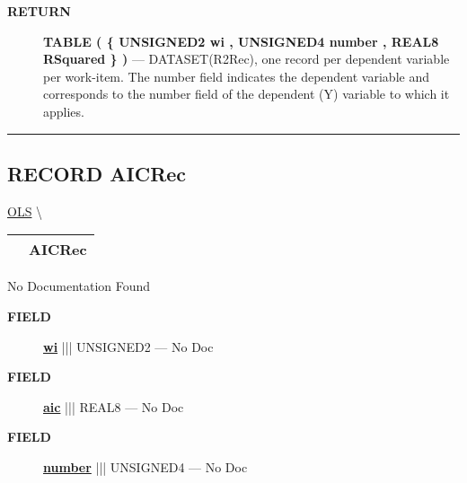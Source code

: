 \par
\begin{description}
\item [\colorbox{tagtype}{\color{white} \textbf{\textsf{RETURN}}}] \textbf{TABLE ( \{ UNSIGNED2 wi , UNSIGNED4 number , REAL8 RSquared \} )} --- DATASET(R2Rec), one record per dependent variable per work-item. The number field indicates the dependent variable and corresponds to the number field of the dependent (Y) variable to which it applies.
\end{description}




\rule{\linewidth}{0.5pt}
\subsection*{\textsf{\colorbox{headtoc}{\color{white} RECORD}
AICRec}}

\hypertarget{ecldoc:linearregression.ols.aicrec}{}
\hspace{0pt} \hyperlink{ecldoc:linearregression.ols}{OLS} \textbackslash 

{\renewcommand{\arraystretch}{1.5}
\begin{tabularx}{\textwidth}{|>{\raggedright\arraybackslash}l|X|}
\hline
\hspace{0pt}\mytexttt{\color{red} } & \textbf{AICRec} \\
\hline
\end{tabularx}
}

\par





No Documentation Found







\par
\begin{description}
\item [\colorbox{tagtype}{\color{white} \textbf{\textsf{FIELD}}}] \textbf{\underline{wi}} ||| UNSIGNED2 --- No Doc
\item [\colorbox{tagtype}{\color{white} \textbf{\textsf{FIELD}}}] \textbf{\underline{aic}} ||| REAL8 --- No Doc
\item [\colorbox{tagtype}{\color{white} \textbf{\textsf{FIELD}}}] \textbf{\underline{number}} ||| UNSIGNED4 --- No Doc
\end{description}





